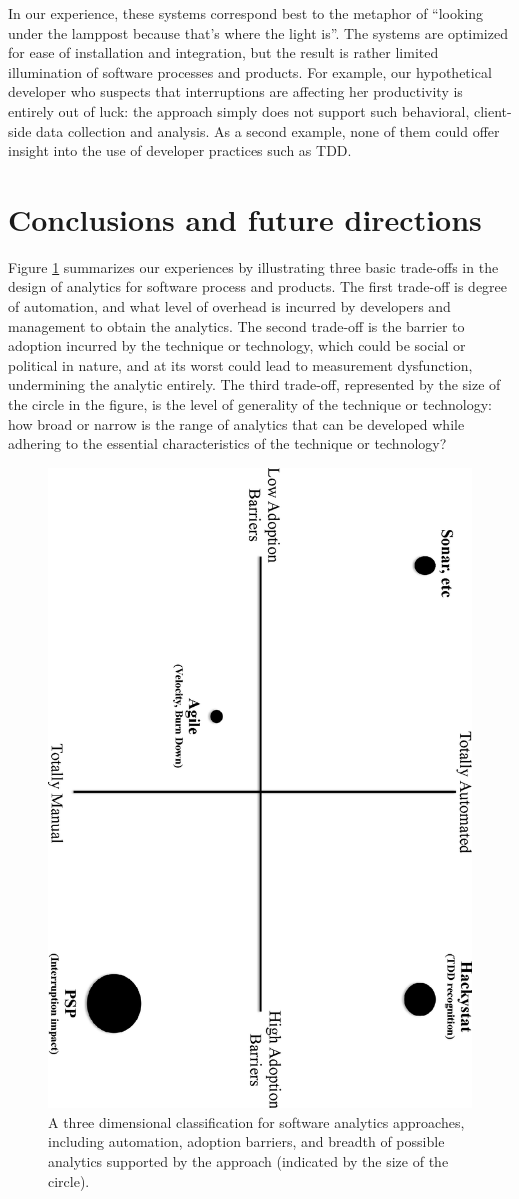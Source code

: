 \documentclass[]{article}
\begin{document}
In our experience, these systems correspond best to the metaphor of ``looking under the
lamppost because that's where the light is''.  The systems are optimized for ease of
installation and integration, but the result is rather limited illumination of software
processes and products.  For example, our hypothetical developer who suspects that
interruptions are affecting her productivity is entirely out of luck: the approach simply
does not support such behavioral, client-side data collection and analysis. As a second
example, none of them could offer insight into the use of developer practices such as TDD.

\section{Conclusions and future directions}

Figure \ref{fig:axis} summarizes our experiences by illustrating three
basic trade-offs in the design of analytics for software process
and products.   The first trade-off is degree of automation, and what level of overhead is
incurred by developers and management to obtain the analytics.  The second trade-off is the barrier
to adoption incurred by the technique or technology, which could be social or political in
nature, and at its worst could lead to measurement dysfunction, undermining the
analytic entirely. The third trade-off, represented by the size of the circle in the figure, is the
level of generality of the technique or technology: how broad or narrow is the range of
analytics that can be developed while adhering to the essential characteristics of the
technique or technology? 

\begin{figure}[!tb]
\centering
\includegraphics[width=0.50\columnwidth, angle=90]{axis.pptx.eps}
\caption{A three dimensional classification for software analytics approaches, including 
  automation, adoption barriers, and breadth of possible analytics supported by the
  approach (indicated by the size of the circle).}
\label{fig:axis}
\end{figure}
\end{document}

